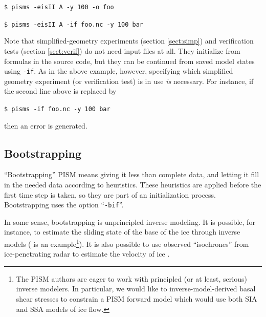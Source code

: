 \documentclass[11pt,final]{amsart}
\newcommand{\pismoptionindex}[1]{\index{options for PISM (and PETSc)!\texttt{-#1}}}
\newcommand{\intextoption}[1]{\texttt{-#1}\pismoptionindex{#1}}
\begin{document}
\verb|$ pisms -eisII A -y 100 -o foo|

\verb|$ pisms -eisII A -if foo.nc -y 100 bar|

\smallskip

Note that simplified-geometry experiments (section \ref{sect:simp}) and verification tests (section \ref{sect:verif}) do not need input files at all.  They initialize from formulas in the source code, but they can be continued from saved model states using \verb|-if|.  As in the above example, however, specifying which simplified geometry experiment (or verification test) is in use \emph{is} necessary.  For instance, if the second line above is replaced by

\verb|$ pisms -if foo.nc -y 100 bar|

\noindent then an error is generated.


\subsection{Bootstrapping}  ``Bootstrapping'' PISM means giving it less than complete data, and letting it fill in the needed data according to heuristics.  These heuristics are applied before the first time step is taken, so they are part of an initialization process.  Bootstrapping uses the option ``\intextoption{bif}''.

In some sense, bootstrapping is unprincipled inverse modeling.  It is possible, for instance, to estimate the sliding state of the base of the ice through inverse models (\cite{JoughinMacAyealTulaczyk} is an example\footnote{The PISM authors are eager to work with principled (or at least, serious) inverse modelers.  In particular, we would like to inverse-model-derived basal shear stresses to constrain a PISM forward model which would use both SIA and SSA models of ice flow.}).  It is also possible to use observed ``isochrones'' from ice-penetrating radar to estimate the velocity of ice \cite{Eisen06draft}.
\end{document}

